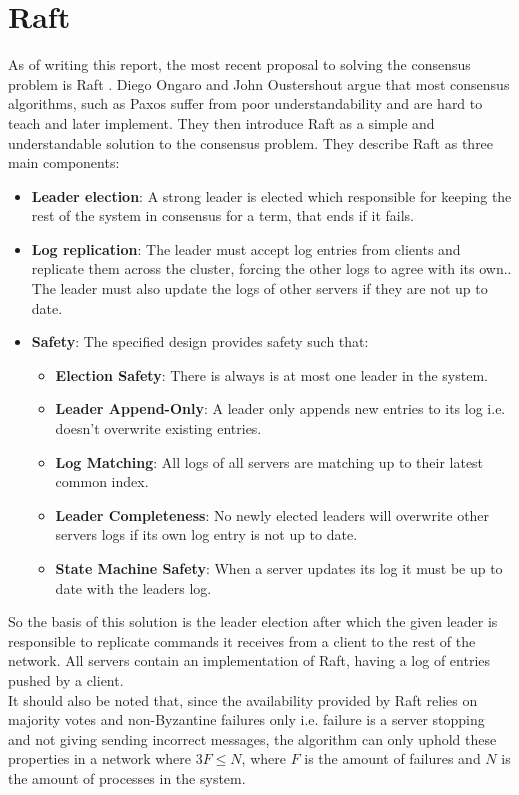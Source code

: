 \section{Raft}
As of writing this report, the most recent proposal to solving the consensus problem is Raft \cite{Raft}. Diego Ongaro and John Oustershout argue that most consensus algorithms, such as Paxos \cite{Paxos} suffer from poor understandability and are hard to teach and later implement. They then introduce Raft as a simple and understandable solution to the consensus problem. They describe Raft as three main components:
\begin{itemize}
\item \textbf{Leader election}: A strong leader is elected which responsible for keeping the rest of the system in consensus for a term, that ends if it fails.
\item \textbf{Log replication}: The leader must accept log entries from clients and replicate them across the cluster, forcing the other logs to agree with its own.\cite{Raft}. The leader must also update the logs of other servers if they are not up to date.
\item \textbf{Safety}: The specified design provides safety such that\cite{Raft}: 
    \begin{itemize}
    \item \textbf{Election Safety}: There is always is at most one leader in the system.
    \item \textbf{Leader Append-Only}: A leader only appends new entries to its log i.e. doesn't overwrite existing entries.
    \item \textbf{Log Matching}: All logs of all servers are matching up to their latest common index.
    \item \textbf{Leader Completeness}: No newly elected leaders will overwrite other servers logs if its own log entry is not up to date.
    \item \textbf{State Machine Safety}: When a server updates its log it must be up to date with the leaders log.
    \end{itemize}
\end{itemize}
So the basis of this solution is the leader election after which the given leader is responsible to replicate commands it receives from a client to the rest of the network. All servers contain an implementation of Raft, having a log of entries pushed by a client.\\
It should also be noted that, since the availability provided by Raft relies on majority votes and non-Byzantine failures only i.e. failure is a server stopping and not giving sending incorrect messages, the algorithm can only uphold these properties in a network where $3F \leq N$, where $F$ is the amount of failures and $N$ is the amount of processes in the system.
